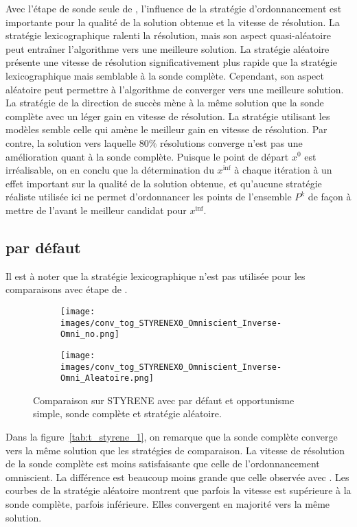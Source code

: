 Avec l'étape de sonde seule de \MADS, l'influence de la stratégie d'ordonnancement est importante pour la qualité de la solution obtenue et la vitesse de résolution. La stratégie lexicographique ralenti la résolution, mais son aspect quasi-aléatoire peut entraîner l'algorithme vers une meilleure solution. La stratégie aléatoire présente une vitesse de résolution significativement plus rapide que la stratégie lexicographique mais semblable à la sonde complète. Cependant, son aspect aléatoire peut permettre à l'algorithme de converger vers une meilleure solution. La stratégie de la direction de succès mène à la même solution que la sonde complète avec un léger gain en vitesse de résolution. La stratégie utilisant les modèles semble celle qui amène le meilleur gain en vitesse de résolution. Par contre, la solution vers laquelle $80\%$ résolutions converge n'est pas une amélioration quant à la sonde complète. Puisque le point de départ $x^0$ est irréalisable, on en conclu que la détermination du $x^{\inf}$ à chaque itération à un effet important sur la qualité de la solution obtenue, et qu'aucune stratégie réaliste utilisée ici ne permet d'ordonnancer les points de l'ensemble $P^k$ de façon à mettre de l'avant le meilleur candidat pour $x^{\inf}$.

\subsection{\MADS par défaut}
Il est à noter que la stratégie lexicographique n'est pas utilisée pour les comparaisons avec étape de \SEARCH. 
\begin{figure}[!htb]
	\centering
	\begin{subfigure}{0.43\textwidth}
		\texttt{[image: images/conv\_tog\_STYRENEX0\_Omniscient\_Inverse-Omni\_no.png]}
	\end{subfigure}%
	\begin{subfigure}{0.43\textwidth}
		\texttt{[image: images/conv\_tog\_STYRENEX0\_Omniscient\_Inverse-Omni\_Aleatoire.png]}
	\end{subfigure}
	\caption{Comparaison sur STYRENE avec \MADS par défaut et opportunisme simple, sonde complète et stratégie aléatoire.}
	\label{fig:t_styrene_1}
\end{figure}
Dans la figure~\ref{tab:t_styrene_1}, on remarque que la sonde complète converge vers la même solution que les stratégies de comparaison. La vitesse de résolution de la sonde complète est moins satisfaisante que celle de l'ordonnancement omniscient. La différence est beaucoup moins grande que celle observée avec \MADS. Les courbes de la stratégie aléatoire montrent que parfois la vitesse est supérieure à la sonde complète, parfois inférieure. Elles convergent en majorité vers la même solution.

